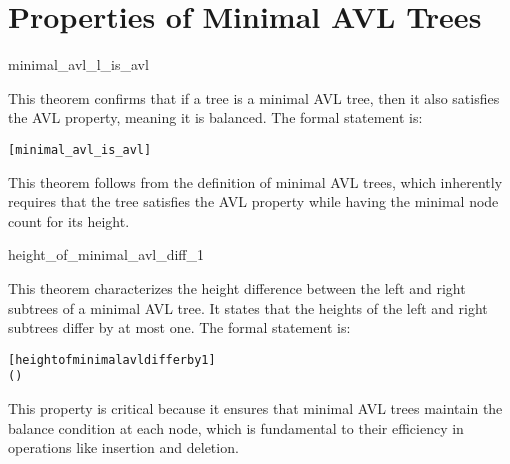 \section{Properties of Minimal AVL Trees}
	
	\begin{thm}{minimal\_avl\_l\_is\_avl}

    This theorem confirms that if a tree is a minimal AVL tree, then it also satisfies the AVL property, meaning it is balanced. The formal statement is:

    \begin{alltt}
    	[minimal_avl_is_avl]
    	\HOLTokenTurnstile{}   \HOLSymConst{\HOLTokenImp{}}  
    \end{alltt}
    
    \end{thm}
    This theorem follows from the definition of minimal AVL trees, which inherently requires that the tree satisfies the AVL property while having the minimal node count for its height.


    \begin{thm}{height\_of\_minimal\_avl\_diff\_1}

    This theorem characterizes the height difference between the left and right subtrees of a minimal AVL tree. It states that the heights of the left and right subtrees differ by at most one. The formal statement is:
    
    \begin{alltt}
    	[height of minimal avl differ by 1]
    	\HOLTokenTurnstile{}  (     ) \HOLSymConst{\HOLTokenImp{}}
    \HOLSymConst{=}  \HOLSymConst{\HOLTokenConj{}}  \HOLSymConst{=}  \HOLSymConst{\HOLTokenDisj{}}   \HOLSymConst{=}   \HOLSymConst{\ensuremath{+}}  \HOLSymConst{\HOLTokenDisj{}}
     \HOLSymConst{=}   \HOLSymConst{\ensuremath{+}} 
    \end{alltt}
    
    
    \end{thm}
    This property is critical because it ensures that minimal AVL trees maintain the balance condition at each node, which is fundamental to their efficiency in operations like insertion and deletion.


